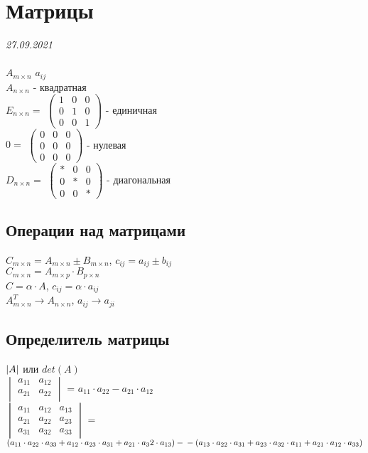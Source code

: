\documentclass[12pt]{article}
\DeclarePairedDelimiter\abs{\lvert}{\rvert}%
\begin{document}
\newpage
\section{Матрицы}
{\hfill \textit{27.09.2021}\\ \vspace{.8cm}\\}
	$A_{m \times n}$ \qquad ${a_{ij}}$\\
	$A_{n \times n}$  - квадратная\\
	$E_{n \times n} = $
	$\begin{pmatrix}
		1 & 0 & 0 \\
		0 & 1 & 0 \\
		0 & 0 & 1
	\end{pmatrix}$  - единичная\\
	$0 = $
	$\begin{pmatrix}
		0 & 0 & 0 \\
		0 & 0 & 0 \\
		0 & 0 & 0
	\end{pmatrix}$ - нулевая\\
	$D_{n \times n} = $
	$\begin{pmatrix}
		* & 0 & 0 \\
		0 & * & 0 \\
		0 & 0 & *
	\end{pmatrix}$ - диагональная\\
	\subsection{Операции над матрицами}
	$C_{m \times n} = A_{m \times n} \pm B_{m \times n}$, \qquad $c_{ij}=a_{ij} \pm b_{ij}$\\
	$C_{m \times n}=A_{m \times p} \cdot B_{p \times n}$\\
	$C = \alpha \cdot A$, \qquad $c_{ij} = \alpha \cdot a_{ij}$\\
	$A_{m \times n}^T \to A_{n \times n}$, \qquad $a_{ij} \to a_{ji}$\\
	\subsection{Определитель матрицы}
	$\abs{A}$ или $det(A)$ \vspace{.2cm}\\
		$\begin{vmatrix}
		a_{11} & a_{12} \\
		a_{21} & a_{22} \\
	\end{vmatrix}$ = $a_{11} \cdot a_{22} - a_{21} \cdot a_{12}$ \vspace{.2cm}\\
	$\begin{vmatrix}
	a_{11} & a_{12} & a_{13} \\
	a_{21} & a_{22} & a_{23} \\
	a_{31} & a_{32} & a_{33}
\end{vmatrix}$ = $(a_{11} \cdot a_{22} \cdot a_{33} + a_{12} \cdot a_{23} \cdot a_{31} + a_{21} \cdot a_32 \cdot a_{13}) -\\- (a_{13} \cdot a_{22} \cdot a_{31} + a_{23} \cdot a_{32} \cdot a_{11} + a_{21} \cdot a_{12} \cdot a_{33})$\\
\end{document}
